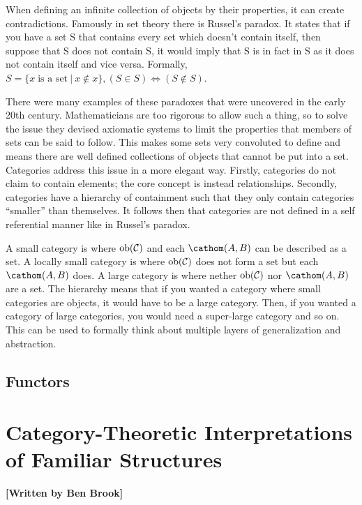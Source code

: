 \documentclass[10pt,a4paper,reqno]{amsart}
\numberwithin{figure}{section}
\begin{document}
When defining an infinite collection of objects by their properties, it can
create contradictions. Famously in set theory there is Russel's paradox.  It
states that if you have a set S that contains every set which doesn't contain
itself, then suppose that S does not contain S, it would imply that S is in fact
in S as it does not contain itself and vice versa.
Formally, $S = \{x\;\text{is a set}\:|\:x\notin x\}, (S\in S) \iff (S\notin S)$.

There were many examples of these paradoxes that were uncovered in the early
20th century. Mathematicians are too rigorous to allow such a thing, so to solve
the issue they devised axiomatic systems to limit the properties that members of
sets can be said to follow.  This makes some sets very convoluted to define and
means there are well defined collections of objects that cannot be put into a
set. Categories address this issue in a more elegant way.  Firstly, categories
do not claim to contain elements; the core concept is instead relationships.
Secondly, categories have a hierarchy of containment such that they only contain
categories ``smaller'' than themselves.  It follows then that categories are not
defined in a self referential manner like in Russel's paradox.

A small category is where $\operatorname{ob}(\mathcal{C})$ and each $\cathom(A,B)$ can be described as a set.
A locally small category is where $\operatorname{ob}(\mathcal{C})$ does not form a set but each
$\cathom(A,B)$ does.
A large category is where nether $\operatorname{ob}(\mathcal{C})$ nor $\cathom(A,B)$ are a set. The hierarchy
means that if you wanted a category where small categories are objects, it would
have to be a large category. Then, if you wanted a category of large categories,
you would need a super-large category and so on. This can be used to formally
think about multiple layers of generalization and abstraction.

\subsection{Functors}


\section{Category-Theoretic %
        Interpretations of Familiar Structures}
\begin{flushright}
        \textbf{[Written by Ben Brook]}
\end{flushright}
\end{document}
